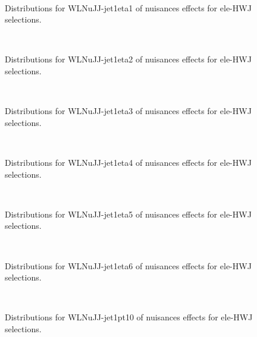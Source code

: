 \begin{figure}[htbp]  
\centering 
\\ 
\caption{ 
   Distributions for WLNuJJ-jet1eta1 of nuisances effects for ele-HWJ selections.
} 
\label{fig:WLNuJJ_jet1eta1_ele_HWJ} 
\end{figure} 




\begin{figure}[htbp]  
\centering 
\\ 
\caption{ 
   Distributions for WLNuJJ-jet1eta2 of nuisances effects for ele-HWJ selections.
} 
\label{fig:WLNuJJ_jet1eta2_ele_HWJ} 
\end{figure} 




\begin{figure}[htbp]  
\centering 
\\ 
\caption{ 
   Distributions for WLNuJJ-jet1eta3 of nuisances effects for ele-HWJ selections.
} 
\label{fig:WLNuJJ_jet1eta3_ele_HWJ} 
\end{figure} 




\begin{figure}[htbp]  
\centering 
\\ 
\caption{ 
   Distributions for WLNuJJ-jet1eta4 of nuisances effects for ele-HWJ selections.
} 
\label{fig:WLNuJJ_jet1eta4_ele_HWJ} 
\end{figure} 




\begin{figure}[htbp]  
\centering 
\\ 
\caption{ 
   Distributions for WLNuJJ-jet1eta5 of nuisances effects for ele-HWJ selections.
} 
\label{fig:WLNuJJ_jet1eta5_ele_HWJ} 
\end{figure} 




\begin{figure}[htbp]  
\centering 
\\ 
\caption{ 
   Distributions for WLNuJJ-jet1eta6 of nuisances effects for ele-HWJ selections.
} 
\label{fig:WLNuJJ_jet1eta6_ele_HWJ} 
\end{figure} 




\begin{figure}[htbp]  
\centering 
\\ 
\caption{ 
   Distributions for WLNuJJ-jet1pt10 of nuisances effects for ele-HWJ selections.
} 
\label{fig:WLNuJJ_jet1pt10_ele_HWJ} 
\end{figure} 




